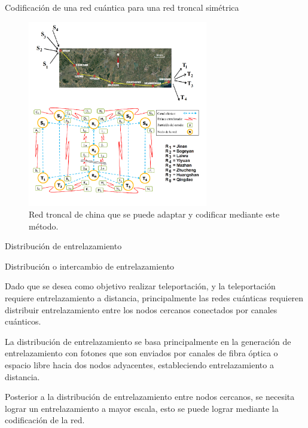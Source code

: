 \documentclass[10pt]{beamer}
\renewenvironment{block}[1]
    {\begin{oldblock}{#1}
        \smallskip
    }
    {
    \end{oldblock}
    }
\begin{document}
\begin{frame}{Codificación de una red cuántica para una red troncal simétrica}
  \begin{block}{}
    \vspace{-20pt}
    \begin{figure}
      \includegraphics[width=0.7\textwidth]{Hguyenchina.png}
      \caption{Red troncal de china que se puede adaptar y codificar mediante este método.}
    \end{figure}
  \end{block}
\end{frame}
\begin{frame}{Distribución de entrelazamiento}
  \begin{block}{Distribución o intercambio de entrelazamiento}
    Dado que se desea como objetivo realizar teleportación, y la teleportación requiere entrelazamiento a distancia, principalmente las redes cuánticas requieren distribuir entrelazamiento entre los nodos cercanos conectados por canales cuánticos. \par
    La distribución de entrelazamiento se basa principalmente en la generación de entrelazamiento con fotones que son enviados por canales de fibra óptica o espacio libre hacia dos nodos adyacentes, estableciendo entrelazamiento a distancia. \par
    Posterior a la distribución de entrelazamiento entre nodos cercanos, se necesita lograr un entrelazamiento a mayor escala, esto se puede lograr mediante la \alert{codificación} de la red.
  \end{block}
\end{frame}
\end{document}
